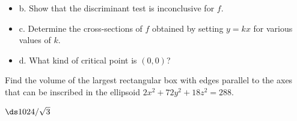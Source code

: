 \begin{exercises}
\begin{itemize}
\item{b.} Show that the discriminant test is inconclusive for $f$.  

\item{c.} Determine the cross-sections of $f$ obtained by setting $y=kx$ for
  various values of $k$.

\item{d.} What kind of critical point is $(0,0)$?

\end{itemize}

\exercise Find the volume of the largest rectangular box with edges
  parallel to the axes that can be inscribed in the ellipsoid
  $2x^2+72y^2+18z^2=288$.
\begin{answer} $\ds 1024/\sqrt3$
\end{answer}

\end{exercises}

